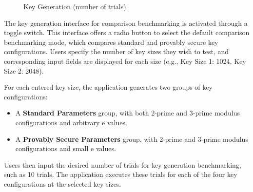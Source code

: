 \documentclass[]{final_report}
\theoremstyle{definition}
\begin{document}
\begin{figure}[H]
     \begin{minipage}{0.55\textwidth}
        \centering
        \caption{Key Generation (number of trials)}
        \label{fig:image2}
    \end{minipage}
\end{figure}
The key generation interface for comparison benchmarking is activated through a toggle switch. This interface offers a radio button to select the default comparison benchmarking mode, which compares standard and provably secure key configurations. Users specify the number of key sizes they wish to test, and corresponding input fields are displayed for each size (e.g., Key Size 1: 1024, Key Size 2: 2048).

For each entered key size, the application generates two groups of key configurations:
\begin{itemize}
    \item A \textbf{Standard Parameters} group, with both 2-prime and 3-prime modulus configurations and arbitrary e values.
    \item A \textbf{Provably Secure Parameters} group, with 2-prime and 3-prime modulus configurations and small e values.
\end{itemize}

Users then input the desired number of trials for key generation benchmarking, such as 10 trials. The application executes these trials for each of the four key configurations at the selected key sizes.
\end{document}

